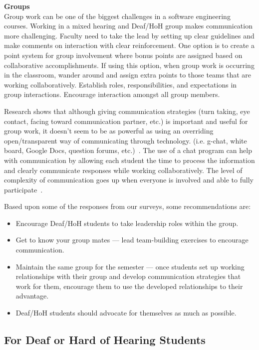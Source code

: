 \documentclass[conference]{IEEEtran}
\begin{document}
\noindent
\textbf{Groups}\\
Group work can be one of the biggest challenges in a software engineering courses. Working in a mixed hearing and Deaf/HoH group makes communication more challenging. Faculty need to take the lead by setting up clear guidelines and make comments on interaction with clear reinforcement. One option is to create a point system for group involvement where bonus points are assigned based on collaborative accomplishments. If using this option, when group work is occurring in the classroom, wander around and assign extra points to those teams that are working collaboratively. Establish roles, responsibilities, and expectations in group interactions.   Encourage interaction amongst all group members.

Research shows that although giving communication strategies (turn taking, eye contact, facing toward communication partner, etc.) is important and useful for group work, it doesn't seem to be as powerful as using an overriding open/transparent way of communicating through technology. (i.e. g-chat, white board, Google Docs, question forums, etc.)~\cite{IRRODL1015}. The use of a chat program can help with communication by allowing each student the time to process the information and clearly communicate responses while working collaboratively. The level of complexity of communication goes up when everyone is involved and able to fully participate~\cite{IRRODL1015}.

Based upon some of the responses from our surveys, some recommendations are:
\begin{itemize}
\item Encourage Deaf/HoH students to take leadership roles within the group.
\item Get to know your group mates --- lead team-building exercises to encourage communication.
\item Maintain the same group for the semester --- once students set up working relationships with their group and develop communication strategies that work for them, encourage them to use the developed relationships to their advantage.
\item Deaf/HoH students should advocate for themselves as much as possible.

 \end{itemize}

\subsection{For Deaf or Hard of Hearing Students}
\end{document}
